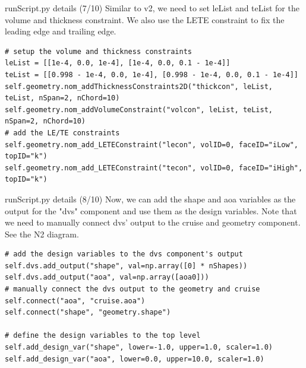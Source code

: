 \documentclass{bredelebeamer}
\begin{document}
\begin{frame}[fragile]{runScript.py details (7/10)}
Similar to v2, we need to set leList and teList for the volume and thickness constraint. We also use the LETE constraint to fix the leading edge and trailing edge.
  \footnotesize
  \lstset{ language=bash }
  \begin{lstlisting}
# setup the volume and thickness constraints
leList = [[1e-4, 0.0, 1e-4], [1e-4, 0.0, 0.1 - 1e-4]]
teList = [[0.998 - 1e-4, 0.0, 1e-4], [0.998 - 1e-4, 0.0, 0.1 - 1e-4]]
self.geometry.nom_addThicknessConstraints2D("thickcon", leList, teList, nSpan=2, nChord=10)
self.geometry.nom_addVolumeConstraint("volcon", leList, teList, nSpan=2, nChord=10)
# add the LE/TE constraints
self.geometry.nom_add_LETEConstraint("lecon", volID=0, faceID="iLow", topID="k")
self.geometry.nom_add_LETEConstraint("tecon", volID=0, faceID="iHigh", topID="k")
  \end{lstlisting}
  \normalsize
  \end{frame}

\begin{frame}[fragile]{runScript.py details (8/10)}
Now, we can add the shape and aoa variables as the output for the "dvs" component and use them as the design variables. Note that we need to manually connect dvs' output to the cruise and geometry component. See the N2 diagram.
  \footnotesize
  \lstset{ language=bash }
  \begin{lstlisting}
# add the design variables to the dvs component's output
self.dvs.add_output("shape", val=np.array([0] * nShapes))
self.dvs.add_output("aoa", val=np.array([aoa0]))
# manually connect the dvs output to the geometry and cruise
self.connect("aoa", "cruise.aoa")
self.connect("shape", "geometry.shape")

# define the design variables to the top level
self.add_design_var("shape", lower=-1.0, upper=1.0, scaler=1.0)
self.add_design_var("aoa", lower=0.0, upper=10.0, scaler=1.0)
  \end{lstlisting}
  \normalsize
  \end{frame}
\end{document}
